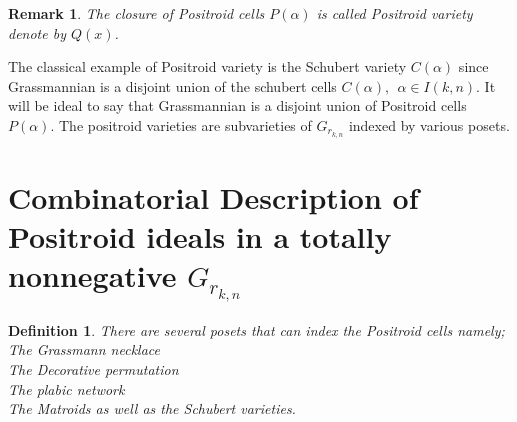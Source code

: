 \documentclass[12pt]{report}
\theoremstyle{theorem}
\newtheorem{definition}[theorem]{Definition}
\newtheorem{remark}[theorem]{Remark}
\begin{document}
\begin{remark}
 \normalfont The closure of Positroid cells $P(\alpha)$ is called Positroid variety denote by $Q(x)$.
\end{remark}
The classical example of Positroid variety is the Schubert variety $C(\alpha)$ since Grassmannian is a disjoint union of the schubert cells $C(\alpha), ~~\alpha\in I(k,n)$. It will be ideal to say that Grassmannian is a disjoint union of Positroid cells $P(\alpha)$.
The positroid varieties are subvarieties of $G_{r_{k,n}}$ indexed by various posets.

\section*{Combinatorial Description of Positroid ideals in a totally nonnegative $G_{r_{k,n}}$} 

\begin{definition}
\normalfont There are several posets that can index the Positroid cells namely;\\
The Grassmann necklace\\
The Decorative permutation\\
The plabic network\\
The Matroids as well as the Schubert varieties.
\end{definition}
\end{document}
